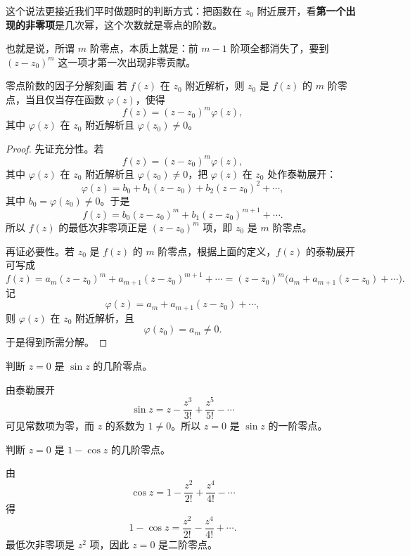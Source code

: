 这个说法更接近我们平时做题时的判断方式：把函数在 $z_0$ 附近展开，看\textbf{第一个出现的非零项}是几次幂，这个次数就是零点的阶数。

也就是说，所谓 $m$ 阶零点，本质上就是：前 $m-1$ 阶项全都消失了，要到 $(z-z_0)^m$ 这一项才第一次出现非零贡献。

\begin{dingli}{零点阶数的因子分解刻画}{}
若 $f(z)$ 在 $z_0$ 附近解析，则 $z_0$ 是 $f(z)$ 的 $m$ 阶零点，当且仅当存在函数 $\varphi(z)$，使得
\[
    f(z)=(z-z_0)^m \varphi(z),
\]
其中 $\varphi(z)$ 在 $z_0$ 附近解析且 $\varphi(z_0)\ne 0$。
\end{dingli}

\begin{proof}
先证充分性。若
\[
    f(z)=(z-z_0)^m \varphi(z),
\]
其中 $\varphi(z)$ 在 $z_0$ 附近解析且 $\varphi(z_0)\ne 0$，把 $\varphi(z)$ 在 $z_0$ 处作泰勒展开：
\[
    \varphi(z)=b_0+b_1(z-z_0)+b_2(z-z_0)^2+\cdots,
\]
其中 $b_0=\varphi(z_0)\ne 0$。于是
\[
    f(z)=b_0(z-z_0)^m+b_1(z-z_0)^{m+1}+\cdots.
\]
所以 $f(z)$ 的最低次非零项正是 $(z-z_0)^m$ 项，即 $z_0$ 是 $m$ 阶零点。

再证必要性。若 $z_0$ 是 $f(z)$ 的 $m$ 阶零点，根据上面的定义，$f(z)$ 的泰勒展开可写成
\[
    f(z)=a_m(z-z_0)^m+a_{m+1}(z-z_0)^{m+1}+\cdots
    =(z-z_0)^m\bigl(a_m+a_{m+1}(z-z_0)+\cdots\bigr).
\]
记
\[
    \varphi(z)=a_m+a_{m+1}(z-z_0)+\cdots,
\]
则 $\varphi(z)$ 在 $z_0$ 附近解析，且
\[
    \varphi(z_0)=a_m\ne 0.
\]
于是得到所需分解。
\end{proof}

\begin{lizi}{}{}
判断 $z=0$ 是 $\sin z$ 的几阶零点。

\begin{jie}
由泰勒展开
\[
    \sin z = z-\frac{z^3}{3!}+\frac{z^5}{5!}-\cdots
\]
可见常数项为零，而 $z$ 的系数为 $1\ne 0$。所以 $z=0$ 是 $\sin z$ 的一阶零点。
\end{jie}
\end{lizi}

\begin{lizi}{}{}
判断 $z=0$ 是 $1-\cos z$ 的几阶零点。

\begin{jie}
由
\[
    \cos z = 1-\frac{z^2}{2!}+\frac{z^4}{4!}-\cdots
\]
得
\[
    1-\cos z = \frac{z^2}{2!}-\frac{z^4}{4!}+\cdots.
\]
最低次非零项是 $z^2$ 项，因此 $z=0$ 是二阶零点。
\end{jie}
\end{lizi}

